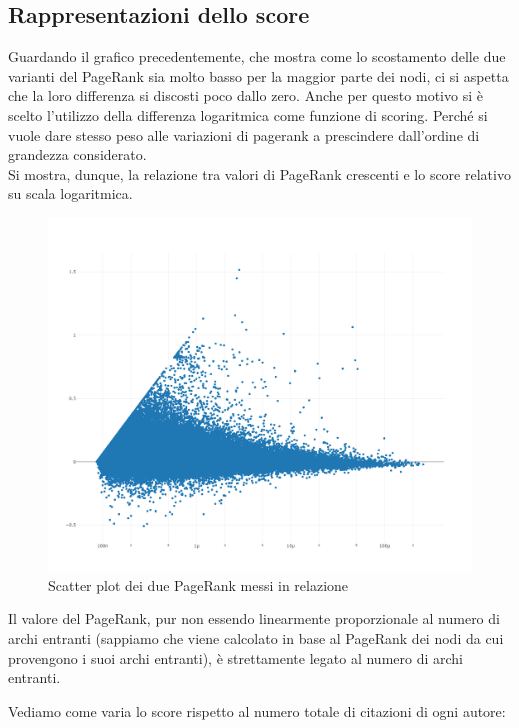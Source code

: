 \documentclass[a4paper, 12pt]{article}
\begin{document}
\subsection{Rappresentazioni dello score}
Guardando il grafico precedentemente, che mostra come lo scostamento delle due varianti del PageRank sia molto basso per la maggior parte dei nodi, ci si aspetta che la loro differenza si discosti poco dallo zero. Anche per questo motivo si è scelto l'utilizzo della differenza logaritmica come funzione di scoring. Perché si vuole dare stesso peso alle variazioni di pagerank a prescindere dall'ordine di grandezza considerato. \\
Si mostra, dunque, la relazione tra valori di PageRank crescenti e lo score relativo su scala logaritmica.
\begin{figure}[H]
  \includegraphics[width=0.8\linewidth]{images/grafico-2.png}
  \caption{Scatter plot dei due PageRank messi in relazione}
\end{figure}
Il valore del PageRank, pur non essendo linearmente proporzionale al numero di archi entranti (sappiamo che viene calcolato in base al PageRank dei nodi da cui provengono i suoi archi entranti), è strettamente legato al numero di archi entranti.
\par Vediamo come varia lo score rispetto al numero totale di citazioni di ogni autore:
\end{document}
